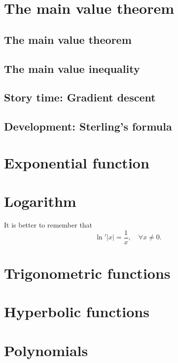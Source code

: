 \documentclass[
	fontsize=10pt, %
	twoside=true, %
	secnumdepth=1, %
	numbers=noenddot, %
]{kaobook}
\begin{document}
\chapter{The main value theorem}

\section{The main value theorem}

\section{The main value inequality}

\section{Story time: Gradient descent}

\section{Development: Sterling's formula}


\chapter{Exponential function}

\chapter{Logarithm}
It is better to remember that
\begin{equation*}
\ln'|x|=\frac{1}{x},\quad\forall x\neq 0.
\end{equation*}

\chapter{Trigonometric functions}

\chapter{Hyperbolic functions}

\chapter{Polynomials}
\end{document}
